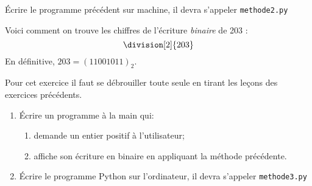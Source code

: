 \documentclass[a4paper,12pt,french]{book}
\begin{document}
\begin{exercice}[]
\'Ecrire le programme précédent sur machine, il devra s'appeler \texttt{methode2.py}
\end{exercice}

\begin{methode}
Voici comment on trouve les chiffres de l'écriture \textit{binaire} de 203 :
$$\division[2]{203}$$
En définitive, $203=(11001011)_2$.
\end{methode}


\begin{exercice}[]
	Pour cet exercice il faut se \og débrouiller tout\cdot e seul\cdot e\fg{} en tirant les leçons des exercices précédents.
\begin{enumerate}[\bfseries 1.]
	\item 	\'Ecrire un programme à la main qui:
	\begin{enumerate}[--]
		\item 	demande un entier positif à l'utilisateur;
		\item 	affiche son écriture en binaire en appliquant la méthode précédente.
	\end{enumerate}
	\item 	\'Ecrire le programme Python sur l'ordinateur, il devra s'appeler \texttt{methode3.py}	
\end{enumerate}

\end{exercice}
\end{document}
